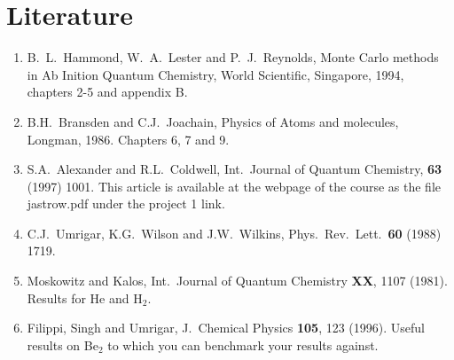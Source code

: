 \documentclass[10pt]{article}
\begin{document}
\section*{Literature}
\begin{enumerate}
\item B.~L.~Hammond, W.~A.~Lester and P.~J.~Reynolds, Monte Carlo methods
in Ab Inition Quantum Chemistry, World Scientific, Singapore, 1994, chapters
2-5 and appendix B.

\item B.H.~Bransden and C.J.~Joachain, Physics of Atoms and molecules,
Longman, 1986. Chapters 6, 7 and 9.
\item S.A.~Alexander and R.L.~Coldwell,
Int.~Journal of Quantum Chemistry, {\bf 63} (1997) 1001.  This article is available 
at the webpage of the course as the file jastrow.pdf under the project 1 link.
\item C.J.~Umrigar, K.G.~Wilson and J.W.~Wilkins, Phys.~Rev.~Lett.~{\bf 60}
(1988) 1719. 

\item Moskowitz and Kalos, Int.~Journal of Quantum Chemistry {\bf XX}, 1107 (1981).
Results for He and H$_2$.
\item Filippi, Singh and Umrigar, J.~Chemical Physics {\bf 105}, 123 (1996).   Useful results on
Be$_2$ to which you can benchmark your results against.


\end{enumerate}
\end{document}
